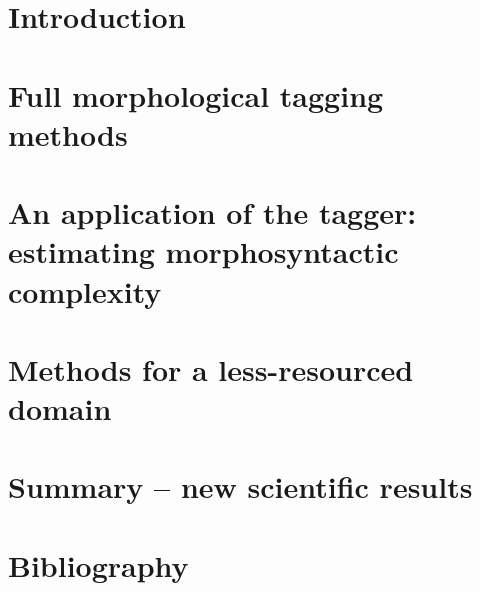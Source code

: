 \documentclass[a4paper,11pt,oneside,times,numbered,custommargin,custombib,PageStyleII]{Classes/PhDThesisPSnPDF}
\begin{document}
\chapter{Introduction}



\chapter{Full morphological tagging methods}\label{chap:tagging}


\chapter{An application of the tagger: estimating morphosyntactic complexity}\label{chap:mlu}


\chapter{Methods for a less-resourced domain}\label{chap:clin}


\chapter{Summary -- new scientific results}\label{chap:sum}


\chapter*{Bibliography}



\end{document}
